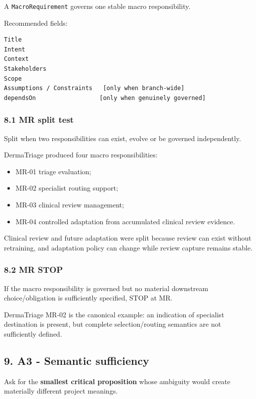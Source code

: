 \documentclass[11pt,a4paper]{article}
\providecommand{\tightlist}{\setlength{\itemsep}{0pt}\setlength{\parskip}{0pt}}
\begin{document}
A \texttt{MacroRequirement} governs one stable macro responsibility.

Recommended fields:

\begin{verbatim}
Title
Intent
Context
Stakeholders
Scope
Assumptions / Constraints   [only when branch-wide]
dependsOn                  [only when genuinely governed]
\end{verbatim}

\subsubsection{8.1 MR split test}\label{81-mr-split-test}

Split when two responsibilities can exist, evolve or be governed
independently.

DermaTriage produced four macro responsibilities:

\begin{itemize}
\tightlist
\item
  MR-01 triage evaluation;
\item
  MR-02 specialist routing support;
\item
  MR-03 clinical review management;
\item
  MR-04 controlled adaptation from accumulated clinical review evidence.
\end{itemize}

Clinical review and future adaptation were split because review can
exist without retraining, and adaptation policy can change while review
capture remains stable.

\subsubsection{8.2 MR STOP}\label{82-mr-stop}

If the macro responsibility is governed but no material downstream
choice/obligation is sufficiently specified, STOP at MR.

DermaTriage MR-02 is the canonical example: an indication of specialist
destination is present, but complete selection/routing semantics are not
sufficiently defined.

\subsection{9. A3 - Semantic
sufficiency}\label{9-a3---semantic-sufficiency}

Ask for the \textbf{smallest critical proposition} whose ambiguity would
create materially different project meanings.
\end{document}
